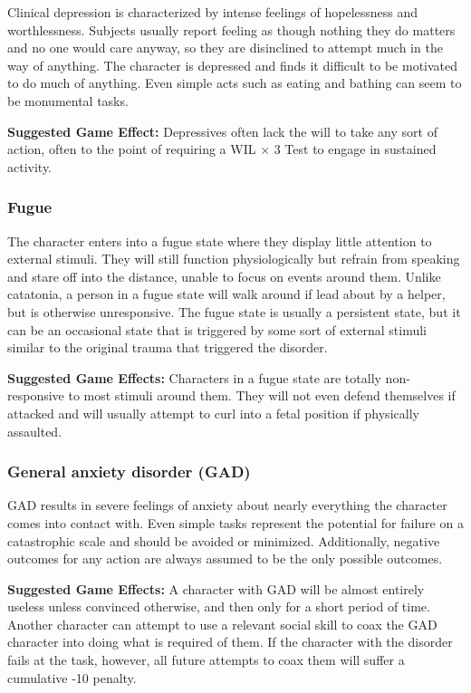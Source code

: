 Clinical depression is characterized by intense feelings of hopelessness and worthlessness. Subjects usually report feeling as though nothing they do matters and no one would care anyway, so they are disinclined to attempt much in the way of anything. The character is depressed and finds it difficult to be motivated to do much of anything. Even simple acts such as eating and bathing can seem to be monumental tasks.

\textbf{Suggested Game Effect:} Depressives often lack the will to take any sort of action, often to the point of requiring a WIL $\times$ 3 Test to engage in sustained activity.

\subsubsection{Fugue}

The character enters into a fugue state where they display little attention to external stimuli. They will still function physiologically but refrain from speaking and stare off into the distance, unable to focus on events around them. Unlike catatonia, a person in a fugue state will walk around if lead about by a helper, but is otherwise unresponsive. The fugue state is usually a persistent state, but it can be an occasional state that is triggered by some sort of external stimuli similar to the original trauma that triggered the disorder.

\textbf{Suggested Game Effects:} Characters in a fugue state are totally non-responsive to most stimuli around them. They will not even defend themselves if attacked and will usually attempt to curl into a fetal position if physically assaulted.

\subsubsection{General anxiety disorder (GAD)}

GAD results in severe feelings of anxiety about nearly everything the character comes into contact with. Even simple tasks represent the potential for failure on a catastrophic scale and should be avoided or minimized. Additionally, negative outcomes for any action are always assumed to be the only possible outcomes.

\textbf{Suggested Game Effects:} A character with GAD will be almost entirely useless unless convinced otherwise, and then only for a short period of time. Another character can attempt to use a relevant social skill to coax the GAD character into doing what is required of them. If the character with the disorder fails at the task, however, all future attempts to coax them will suffer a cumulative -10 penalty.

